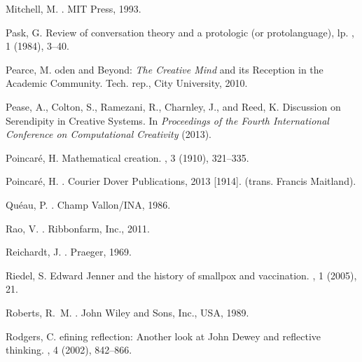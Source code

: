 \begin{thebibliography}{10}
{\sc Mitchell, M.}
.
\newblock MIT Press, 1993.

{\sc Pask, G.}
\newblock Review of conversation theory and a protologic (or protolanguage),
  lp.
, 1 (1984), 3--40.

{\sc Pearce, M.}
oden and {B}eyond: \emph{{T}he {C}reative {M}ind} and its
  {R}eception in the {A}cademic {C}ommunity.
\newblock Tech. rep., City University, 2010.

{\sc Pease, A., Colton, S., Ramezani, R., Charnley, J., and Reed, K.}
 {D}iscussion on {S}erendipity in {C}reative {S}ystems.
\newblock In {\em Proceedings of the Fourth International Conference on
  Computational Creativity\/} (2013).

{\sc Poincar{\'e}, H.}
\newblock Mathematical creation.
, 3 (1910), 321--335.

{\sc Poincar{\'e}, H.}
.
\newblock Courier Dover Publications, 2013 [1914].
\newblock (trans. Francis Maitland).

{\sc Qu{\'e}au, P.}
.
\newblock Champ Vallon/INA, 1986.

{\sc Rao, V.}
.
\newblock Ribbonfarm, Inc., 2011.

{\sc Reichardt, J.}
.
\newblock Praeger, 1969.

{\sc Riedel, S.}
\newblock Edward {J}enner and the history of smallpox and vaccination.
, 1 (2005),
  21.

{\sc Roberts, R.~M.}
.
\newblock John Wiley and Sons, Inc., USA, 1989.

{\sc Rodgers, C.}
efining reflection: {A}nother look at {J}ohn {D}ewey and
  reflective thinking.
, 4 (2002), 842--866.


\end{thebibliography}
